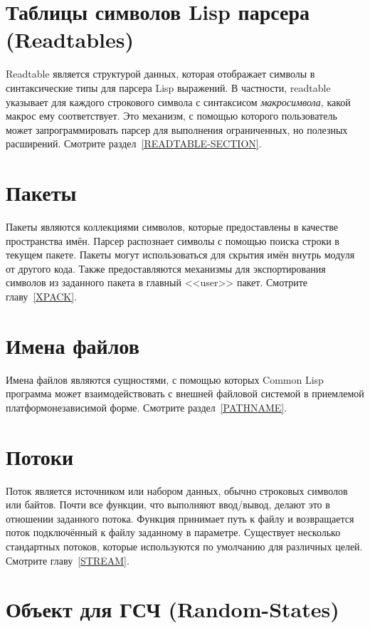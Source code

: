 \section{Таблицы символов Lisp парсера (Readtables)}

Readtable является структурой данных, которая отображает символы в
синтаксические типы для парсера Lisp выражений.
В частности, readtable указывает для каждого строкового символа с синтаксисом
\emph{макросимвола}, какой макрос ему соответствует. Это механизм, с помощью
которого пользователь может запрограммировать парсер для выполнения
ограниченных, но полезных расширений.
Смотрите раздел~\ref{READTABLE-SECTION}.

\section{Пакеты}

Пакеты являются коллекциями символов, которые предоставлены в качестве
пространства имён. Парсер распознает символы с помощью поиска строки в текущем
пакете. Пакеты могут использоваться для скрытия имён внутрь модуля от другого
кода. Также предоставляются механизмы для экспортирования символов из заданного
пакета в главный <<user>> пакет.
Смотрите главу~\ref{XPACK}.

\section{Имена файлов}

Имена файлов являются сущностями, с помощью которых Common Lisp программа может
взаимодействовать с внешней файловой системой в приемлемой платформонезависимой
форме. Смотрите раздел~\ref{PATHNAME}.

\section{Потоки}

Поток является источником или набором данных, обычно строковых символов или
байтов. Почти все функции, что выполняют ввод/вывод, делают это в отношении
заданного потока. Функция  принимает путь к файлу и возвращается поток
подключённый к файлу заданному в параметре.
Существует несколько стандартных потоков, которые используются по умолчанию для
различных целей. Смотрите главу~\ref{STREAM}.

\section{Объект для ГСЧ (Random-States)}

